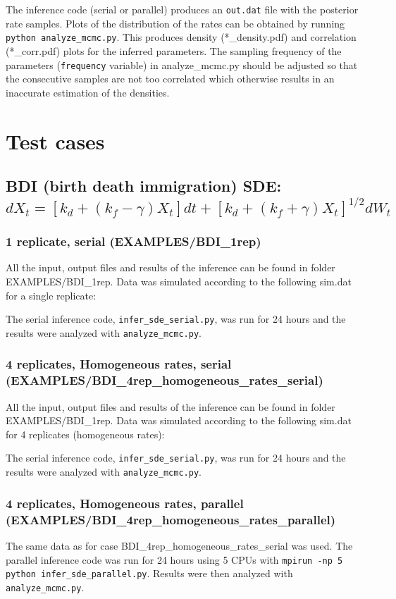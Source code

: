 \documentclass[]{article}   %
\begin{document}
The inference code (serial or parallel) produces an {\tt out.dat} file with the posterior rate samples. Plots of the distribution of the rates can be obtained by running {\tt python analyze\_mcmc.py}. This produces density (*\_density.pdf) and correlation (*\_corr.pdf) plots for the inferred parameters. The sampling frequency of the parameters ({\tt frequency} variable) in {analyze\_mcmc.py} should be adjusted so that the consecutive samples are not too correlated which otherwise results in an inaccurate estimation of the densities.

\newpage
\section{Test cases}
\subsection{BDI {(\small birth death immigration)} SDE: $dX_{t} =  \left[k_{d} + \left(k_{f} - \gamma\right) X_{t} \right] dt + \left[k_{d} + \left(k_{f} + \gamma\right) X_{t} \right]^{1/2} d W_{t}$}

\subsubsection{1 replicate, serial (EXAMPLES/BDI\_1rep)}

All the input, output files and results of the inference can be found in folder EXAMPLES/BDI\_1rep. Data was simulated according to the following sim.dat for a single replicate:

The serial inference code, {\tt infer\_sde\_serial.py}, was run for 24 hours and the results were analyzed with {\tt analyze\_mcmc.py}.


\subsubsection{4 replicates, Homogeneous rates, serial (EXAMPLES/BDI\_4rep\_homogeneous\_rates\_serial)}

All the input, output files and results of the inference can be found in folder EXAMPLES/BDI\_1rep. 
Data was simulated according to the following sim.dat for 4 replicates (homogeneous rates):

The serial inference code, {\tt infer\_sde\_serial.py}, was run for 24 hours and the results were analyzed with {\tt analyze\_mcmc.py}.


\subsubsection{4 replicates, Homogeneous rates, parallel (EXAMPLES/BDI\_4rep\_homogeneous\_rates\_parallel)}
The same data as for case BDI\_4rep\_homogeneous\_rates\_serial was used. The parallel inference code was run for 24 hours using 5 CPUs with {\tt mpirun -np 5 python infer\_sde\_parallel.py}. Results were then analyzed with {\tt analyze\_mcmc.py}.
\end{document}
